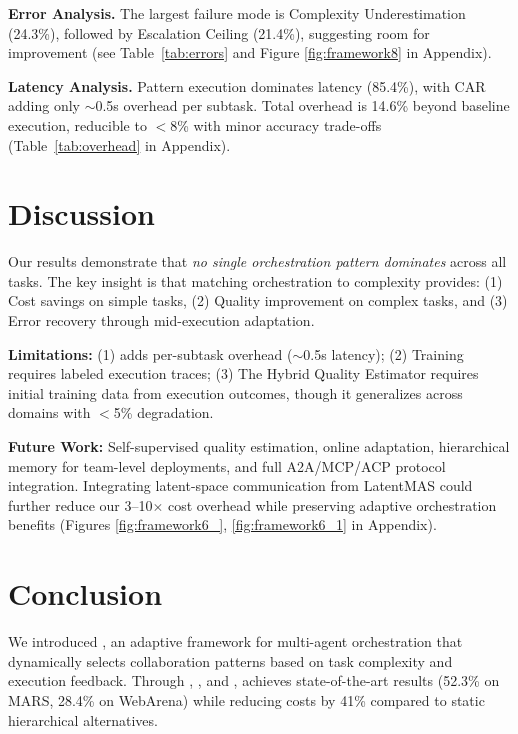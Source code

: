 \documentclass{article}
\theoremstyle{plain}
\theoremstyle{definition}
\theoremstyle{remark}
\begin{document}


\textbf{Error Analysis.}
The largest failure mode is Complexity Underestimation (24.3\%), followed by Escalation Ceiling (21.4\%), suggesting room for \car{} improvement (see Table~\ref{tab:errors} and Figure \ref{fig:framework8} in Appendix).

\textbf{Latency Analysis.}
Pattern execution dominates latency (85.4\%), with CAR adding only $\sim$0.5s overhead per subtask. Total overhead is 14.6\% beyond baseline execution, reducible to $<$8\% with minor accuracy trade-offs (Table~\ref{tab:overhead} in Appendix).


\section{Discussion} 
\label{sec:discussion}

Our results demonstrate that \emph{no single orchestration pattern dominates} across all tasks. The key insight is that matching orchestration to complexity provides: (1) Cost savings on simple tasks, (2) Quality improvement on complex tasks, and (3) Error recovery through mid-execution adaptation.

\textbf{Limitations:} (1) \car{} adds per-subtask overhead ($\sim$0.5s latency); (2) Training requires labeled execution traces; (3) The Hybrid Quality Estimator requires initial training data from execution outcomes, though it generalizes across domains with $<$5\% degradation.

\textbf{Future Work:} Self-supervised quality estimation, online \car{} adaptation, hierarchical memory for team-level deployments, and full A2A/MCP/ACP protocol integration. Integrating latent-space communication from LatentMAS could further reduce our 3--10$\times$ cost overhead while preserving adaptive orchestration benefits (Figures \ref{fig:framework6_}, \ref{fig:framework6_1} in Appendix).

\section{Conclusion}
\label{sec:conclusion}

We introduced \amore{}, an adaptive framework for multi-agent orchestration that dynamically selects collaboration patterns based on task complexity and execution feedback. Through \car{}, \rcm{}, and \uma{}, \amore{} achieves state-of-the-art results (52.3\% on MARS, 28.4\% on WebArena) while reducing costs by 41\% compared to static hierarchical alternatives.
\end{document}
